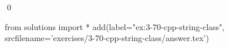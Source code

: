 
\begin{ex}
  \label{ex:3-70-cpp-string-class}
  
  \qed
\end{ex}
\begin{python0}
from solutions import *
add(label="ex:3-70-cpp-string-class",
    srcfilename='exercises/3-70-cpp-string-class/answer.tex')
\end{python0}
